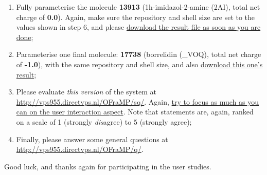 \begin{enumerate}
\item Fully parameterise the molecule \textbf{13913} (1h-imidazol-2-amine (2AI), total net charge of \textbf{0.0}). Again, make sure the repository and shell size are set to the values shown in step 6, and please \underline{download the result file as soon as you are done};
\item Parameterise one final molecule: \textbf{17738} (borrelidin (\_VOQ), total net charge of \textbf{-1.0}), with the same repository and shell size, and also \underline{download this one's result};
\item Please evaluate \emph{this version} of the system at \url{http://vps955.directvps.nl/OFraMP/sq/}. Again, \underline{try to focus as much as you can on the user interaction aspect}. Note that statements are, again, ranked on a scale of 1 (strongly \emph{dis}agree) to 5 (strongly agree);
\item Finally, please answer some general questions at \url{http://vps955.directvps.nl/OFraMP/q/}.
\end{enumerate}
Good luck, and thanks again for participating in the user studies.

\begin{comment}
Kind regards,
Jimi van der Woning
\end{comment}

